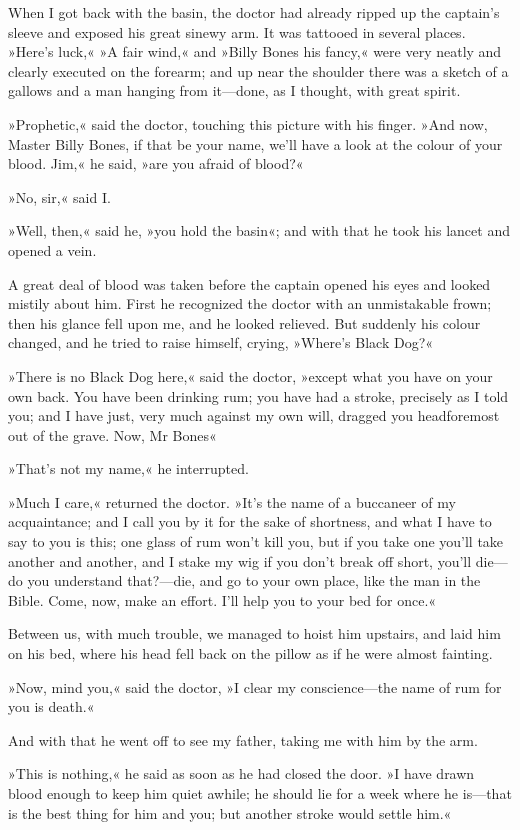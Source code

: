 When I got back with the basin, the doctor had already ripped up the captain's sleeve and exposed his great sinewy arm. It was tattooed in several places. »Here's luck,« »A fair wind,« and »Billy Bones his fancy,« were very neatly and clearly executed on the forearm; and up near the shoulder there was a sketch of a gallows and a man hanging from it—done, as I thought, with great spirit.

»Prophetic,« said the doctor, touching this picture with his finger. »And now, Master Billy Bones, if that be your name, we'll have a look at the colour of your blood. Jim,« he said, »are you afraid of blood?«

»No, sir,« said I.

»Well, then,« said he, »you hold the basin«; and with that he took his lancet and opened a vein.

A great deal of blood was taken before the captain opened his eyes and looked mistily about him. First he recognized the doctor with an unmistakable frown; then his glance fell upon me, and he looked relieved. But suddenly his colour changed, and he tried to raise himself, crying, »Where's Black Dog?«

»There is no Black Dog here,« said the doctor, »except what you have on your own back. You have been drinking rum; you have had a stroke, precisely as I told you; and I have just, very much against my own will, dragged you headforemost out of the grave. Now, Mr Bones\longdash«

»That's not my name,« he interrupted.

»Much I care,« returned the doctor. »It's the name of a buccaneer of my acquaintance; and I call you by it for the sake of shortness, and what I have to say to you is this; one glass of rum won't kill you, but if you take one you'll take another and another, and I stake my wig if you don't break off short, you'll die—do you understand that?—die, and go to your own place, like the man in the Bible. Come, now, make an effort. I'll help you to your bed for once.«

Between us, with much trouble, we managed to hoist him upstairs, and laid him on his bed, where his head fell back on the pillow as if he were almost fainting.

»Now, mind you,« said the doctor, »I clear my conscience—the name of rum for you is death.«

And with that he went off to see my father, taking me with him by the arm.

»This is nothing,« he said as soon as he had closed the door. »I have drawn blood enough to keep him quiet awhile; he should lie for a week where he is—that is the best thing for him and you; but another stroke would settle him.«
